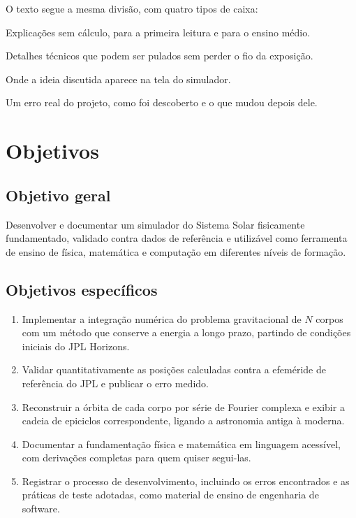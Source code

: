 O texto segue a mesma divisão, com quatro tipos de caixa:

\begin{paracomecar}
Explicações sem cálculo, para a primeira leitura e para o ensino médio.
\end{paracomecar}

\begin{paraaprofundar}
Detalhes técnicos que podem ser pulados sem perder o fio da exposição.
\end{paraaprofundar}

\begin{noprograma}
Onde a ideia discutida aparece na tela do simulador.
\end{noprograma}

\begin{licao}
Um erro real do projeto, como foi descoberto e o que mudou depois dele.
\end{licao}

\section{Objetivos}

\subsection{Objetivo geral}

Desenvolver e documentar um simulador do Sistema Solar fisicamente fundamentado, validado contra dados de referência e utilizável como ferramenta de ensino de física, matemática e computação em diferentes níveis de formação.

\subsection{Objetivos específicos}

\begin{enumerate}
  \item Implementar a integração numérica do problema gravitacional de $N$ corpos com um método que conserve a energia a longo prazo, partindo de condições iniciais do JPL Horizons.
  \item Validar quantitativamente as posições calculadas contra a efeméride de referência do JPL e publicar o erro medido.
  \item Reconstruir a órbita de cada corpo por série de Fourier complexa e exibir a cadeia de epiciclos correspondente, ligando a astronomia antiga à moderna.
  \item Documentar a fundamentação física e matemática em linguagem acessível, com derivações completas para quem quiser segui-las.
  \item Registrar o processo de desenvolvimento, incluindo os erros encontrados e as práticas de teste adotadas, como material de ensino de engenharia de software.
\end{enumerate}

